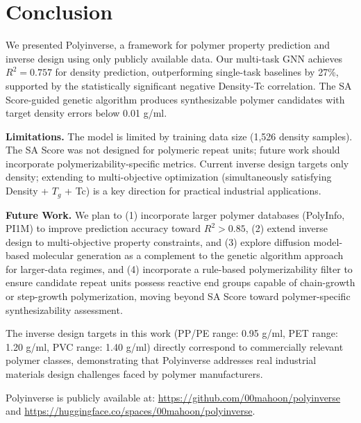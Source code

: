 \documentclass{article}
\begin{document}
\section{Conclusion}

We presented Polyinverse, a framework for polymer property prediction
and inverse design using only publicly available data.
Our multi-task GNN achieves $R^2 = 0.757$ for density prediction,
outperforming single-task baselines by 27\%, supported by the
statistically significant negative Density-Tc correlation.
The SA Score-guided genetic algorithm produces synthesizable polymer
candidates with target density errors below 0.01 g/ml.

\noindent\textbf{Limitations.}
The model is limited by training data size (1,526 density samples).
The SA Score was not designed for polymeric repeat units; future work
should incorporate polymerizability-specific metrics.
Current inverse design targets only density; extending to
multi-objective optimization (simultaneously satisfying Density + $T_g$ + Tc)
is a key direction for practical industrial applications.

\noindent\textbf{Future Work.}
We plan to (1) incorporate larger polymer databases (PolyInfo, PI1M)
to improve prediction accuracy toward $R^2 > 0.85$,
(2) extend inverse design to multi-objective property constraints,
and (3) explore diffusion model-based molecular generation as a
complement to the genetic algorithm approach for larger-data regimes,
and (4) incorporate a rule-based polymerizability filter to ensure
candidate repeat units possess reactive end groups capable of
chain-growth or step-growth polymerization, moving beyond SA Score
toward polymer-specific synthesizability assessment.

The inverse design targets in this work (PP/PE range: 0.95 g/ml, 
PET range: 1.20 g/ml, PVC range: 1.40 g/ml) directly correspond to 
commercially relevant polymer classes, demonstrating that Polyinverse 
addresses real industrial materials design challenges faced by polymer 
manufacturers.

Polyinverse is publicly available at:
\url{https://github.com/00mahoon/polyinverse} and
\url{https://huggingface.co/spaces/00mahoon/polyinverse}.
\end{document}
